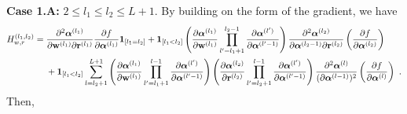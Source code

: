 {\bf Case 1.A:} $2 \leq l_1 \leq l_2 \leq L+1$. By building on the form of the gradient, we have 
\begin{align*}
H_{w,r}^{(l_1,l_2)} & = \frac{\partial^2 \boldsymbol{\alpha}^{(l_1)}}{\partial \mathbf{w}^{(l_1)} \partial \mathbf{r}^{(l_1)}} \frac{\partial f}{\partial \boldsymbol{\alpha}^{(l_1)}} \bm{1}_{[l_1 =l_2]} +  \bm{1}_{[l_1 <l_2]}\left( \frac{\partial \boldsymbol{\alpha}^{(l_1)}}{\partial \mathbf{w}^{(l_1)}}  \prod_{l'=l_1+1}^{l_2-1} \frac{\partial \boldsymbol{\alpha}^{(l')}}{\partial \boldsymbol{\alpha}^{(l'-1)}} \right) \frac{\partial^2 \boldsymbol{\alpha}^{(l_2)}}{\partial \boldsymbol{\alpha}^{(l_2-1)} \partial \mathbf{r}^{(l_2)}} \left(\frac{\partial f}{\partial \boldsymbol{\alpha}^{(l_2)}} \right) \\
& ~~~~ + \bm{1}_{[l_1 <l_2]}\sum_{l=l_2+1}^{L+1} \left( \frac{\partial \boldsymbol{\alpha}^{(l_1)}}{\partial \mathbf{w}^{(l_1)}} \prod_{l'=l_1+1}^{l-1} \frac{\partial \boldsymbol{\alpha}^{(l')}}{\partial \boldsymbol{\alpha}^{(l'-1)}} \right)  \left( \frac{\partial \boldsymbol{\alpha}^{(l_2)}}{\partial \mathbf{r}^{(l_2)}} \prod_{l'=l_2+1}^{l-1} \frac{\partial \boldsymbol{\alpha}^{(l')}}{\partial \boldsymbol{\alpha}^{(l'-1)}} \right) \frac{\partial^2 \boldsymbol{\alpha}^{(l)}}{(\partial \boldsymbol{\alpha}^{(l-1)})^2}  \left(\frac{\partial f}{\partial \boldsymbol{\alpha}^{(l)}} \right) ~. 
\end{align*}
Then,
